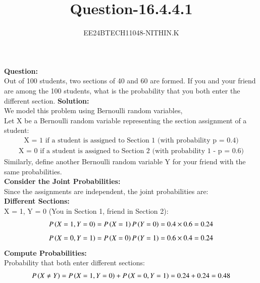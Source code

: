 \documentclass[journal]{IEEEtran}
\numberwithin{equation}{enumi}
\numberwithin{figure}{enumi}
\begin{document}


\title{Question-16.4.4.1}
\author{EE24BTECH11048-NITHIN.K} 
{\let\newpage\relax\maketitle}
\textbf{Question:}\\
Out of 100 students, two sections of 40 and 60 are formed. If you and your friend are among the 100 students, what is the probability that you both enter the different section.
\textbf{Solution:}\\
We model this problem using Bernoulli random variables,\\
Let X be a Bernoulli random variable representing the section assignment of a student:\\
\begin{align*}
	\text{X = 1 if a student is assigned to Section 1 (with probability p = 0.4)}
\end{align*}
\begin{align*}
	\text{X = 0 if a student is assigned to Section 2 (with probability 1 - p = 0.6)}
\end{align*}
Similarly, define another Bernoulli random variable Y for your friend with the same probabilities.\\
\textbf{Consider the Joint Probabilities:}\\
Since the assignments are independent, the joint probabilities are:\\
\textbf{Different Sections:}\\
X = 1, Y = 0 (You in Section 1, friend in Section 2):
\begin{align}
	P\left(X = 1, Y = 0\right) = P\left(X = 1\right)P\left(Y = 0\right) = 0.4 \times 0.6 = 0.24
\end{align}
\begin{align}
        P\left(X = 0, Y = 1\right) = P\left(X = 0\right)P\left(Y = 1\right) = 0.6 \times 0.4 = 0.24
\end{align}
\textbf{Compute Probabilities:}\\
Probability that both enter different sections:\\
\begin{align}
	P\left(X \neq Y\right) = P\left(X = 1, Y = 0\right) + P\left(X = 0, Y = 1\right) = 0.24 + 0.24 = 0.48
\end{align}
\end{document}

